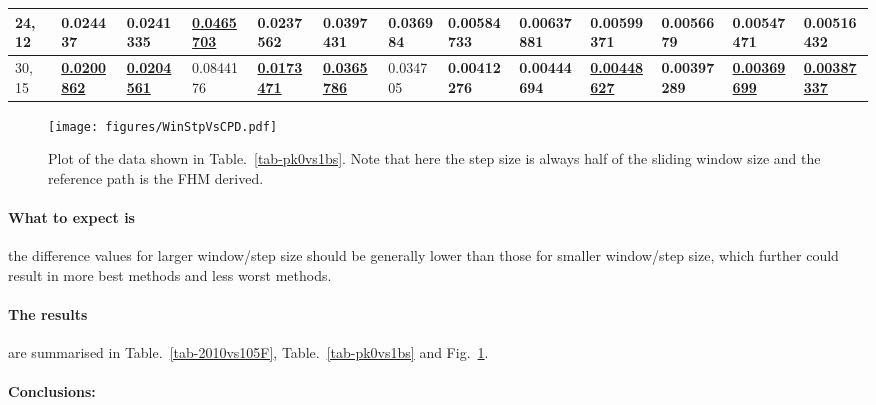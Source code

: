 \begin{table*}
{\begin{tabular}{|l|l|l|l|l|l|l|l|l|l|l|l|l|}
24, 12 & {\color[HTML]{32CB00} \textbf{0.024437}} & {\color[HTML]{32CB00} \textbf{0.0241335}} & {\color[HTML]{009901} {\ul \textbf{0.0465703}}} & {\color[HTML]{32CB00} \textbf{0.0237562}} & {\color[HTML]{32CB00} \textbf{0.0397431}} & 0.036984 & 0.00584733 & 0.00637881 & {\color[HTML]{32CB00} \textbf{0.00599371}} & {\color[HTML]{34FF34} \textbf{0.0056679}} & {\color[HTML]{32CB00} \textbf{0.00547471}} & {\color[HTML]{32CB00} \textbf{0.00516432}} \\ \hline
30, 15 & {\color[HTML]{009901} {\ul \textbf{0.0200862}}} & {\color[HTML]{009901} {\ul \textbf{0.0204561}}} & 0.0844176 & {\color[HTML]{009901} {\ul \textbf{0.0173471}}} & {\color[HTML]{009901} {\ul \textbf{0.0365786}}} & 0.034705 & {\color[HTML]{32CB00} \textbf{0.00412276}} & {\color[HTML]{34FF34} \textbf{0.00444694}} & {\color[HTML]{009901} {\ul \textbf{0.00448627}}} & {\color[HTML]{32CB00} \textbf{0.00397289}} & {\color[HTML]{009901} {\ul \textbf{0.00369699}}} & {\color[HTML]{009901} {\ul \textbf{0.00387337}}} \\ \hline
\end{tabular}%
}
\end{table*}

\begin{figure}
\centering
\texttt{[image: figures/WinStpVsCPD.pdf]}
\caption[Sliding window and step sizes versus CPD]{Plot of the data shown in
  Table.~\ref{tab-pk0vs1bs}. Note that here the step size is always half of the
  sliding window size and the reference path is the FHM
  derived.}\label{fig-WinStpVsCPD}
\end{figure}

\paragraph{What to expect is}
the difference values for larger window/step size should be generally lower than
those for smaller window/step size, which further could result in more best
methods and less worst methods.

\paragraph{The results}
are summarised in Table.~\ref{tab-2010vs105F}, Table.~\ref{tab-pk0vs1bs} and
Fig.~\ref{fig-WinStpVsCPD}.

\paragraph{Conclusions:}


